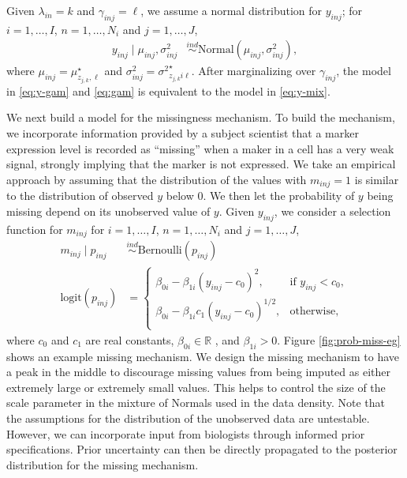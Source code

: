 \documentclass[12pt,]{article}
\newcommand{\p}[1]{\left(#1\right)}
\newcommand{\ind}{\overset{ind}{\sim}}
\def\logit{\text{logit}}
\def\Bern{\text{Bernoulli}}
\def\Prob{\text{Pr}}
\begin{document}
Given \(\lambda_{in}=k\) and \(\gamma_{inj}=\ell\), we assume a normal
distribution for \(y_{inj}\); for \(i=1, \ldots, I\),
\(n=1, \ldots, N_i\) and \(j=1, \ldots, J\),
\begin{align}
  y_{inj} \mid \mu_{inj}, \sigma^2_{inj}  &\ind \text{Normal}(\mu_{inj}, \sigma^2_{inj}), \label{eq:y-gam}
\end{align}
where \(\mu_{inj} = \mu^\star_{z_{j,k},\ell}\) and \(\sigma^2_{inj} =
{\sigma^{2}}^\star_{z_{j,k}i\ell}\). After marginalizing over $\gamma_{inj}$,
the model in \eqref{eq:y-gam} and \eqref{eq:gam} is equivalent to the model in
\eqref{eq:y-mix}.  

We next build a model for the missingness mechanism.  To build the mechanism,
we incorporate information provided by a subject scientist that a marker
expression level is recorded as ``missing'' when a maker in a cell has a very
weak signal, strongly implying that the marker is not expressed.  We take an
empirical approach by assuming that the distribution of the values with
$m_{inj}=1$ is similar to the distribution of observed $y$ below 0. We then let
the probability of $y$ being missing depend on its unobserved value of $y$.
%
Given
\(y_{inj}\), we consider a selection function for \(m_{inj}\) for
\(i=1, \ldots, I\), \(n=1, \ldots, N_i\) and \(j=1, \ldots, J\),
\begin{align}
  m_{inj} \mid p_{inj} &\ind \Bern(p_{inj}) \label{eq:missing} \\
  \logit(p_{inj}) &= \begin{cases}
  \beta_{0i} - \beta_{1i}(y_{inj}-c_0)^2, & \text{if } y_{inj} < c_0\nonumber, \\
  \beta_{0i} - \beta_{1i}c_1\p{y_{inj}-c_0}^{1/2}, & \text{otherwise}, \nonumber \\
  \end{cases} 
\end{align}
where \(c_0\) and \(c_1\) are real constants, $\beta_{0i} \in \mathbb{R}$ , and
$\beta_{1i} > 0$. Figure \ref{fig:prob-miss-eg} shows an example missing mechanism. We design the
missing mechanism to have a peak in the middle to discourage missing values
from being imputed as either extremely large or extremely small values. This
helps to control the size of the scale parameter in the mixture of Normals used
in the data density. Note that the assumptions for the distribution of the
unobserved data are untestable. However, we can incorporate input from
biologists through informed prior specifications. Prior uncertainty can then be
directly propagated to the posterior distribution for the missing mechanism.
\end{document}
